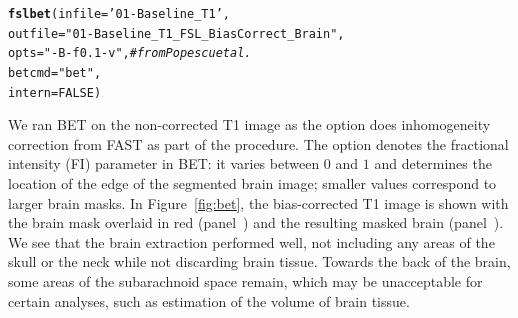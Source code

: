 \documentclass[a4paper]{report}\usepackage[]{graphicx}\usepackage[]{color}
\makeatletter
\newcommand{\hlnum}[1]{\textcolor[rgb]{0.686,0.059,0.569}{#1}}%
\newcommand{\hlstr}[1]{\textcolor[rgb]{0.192,0.494,0.8}{#1}}%
\newcommand{\hlcom}[1]{\textcolor[rgb]{0.678,0.584,0.686}{\textit{#1}}}%
\newcommand{\hlstd}[1]{\textcolor[rgb]{0.345,0.345,0.345}{#1}}%
\newcommand{\hlkwc}[1]{\textcolor[rgb]{0.333,0.667,0.333}{#1}}%
\newcommand{\hlkwd}[1]{\textcolor[rgb]{0.737,0.353,0.396}{\textbf{#1}}}%
\newenvironment{kframe}{%
 \def\at@end@of@kframe{}%
 \ifinner\ifhmode%
  \def\at@end@of@kframe{\end{minipage}}%
  \begin{minipage}{\columnwidth}%
 \fi\fi%
 \def\FrameCommand##1{\hskip\@totalleftmargin \hskip-\fboxsep
 \colorbox{shadecolor}{##1}\hskip-\fboxsep
     \hskip-\linewidth \hskip-\@totalleftmargin \hskip\columnwidth}%
 \MakeFramed {\advance\hsize-\width
   \@totalleftmargin\z@ \linewidth\hsize
   \@setminipage}}%
 {\par\unskip\endMakeFramed%
 \at@end@of@kframe}
\newenvironment{knitrout}{}{} %
\DeclareRobustCommand\code{\bgroup\@noligs\@codex}
\makeatother
\begin{document}
\begin{article}
\begin{knitrout}
\color{fgcolor}\begin{kframe}
\begin{alltt}
\hlkwd{fslbet}\hlstd{(}\hlkwc{infile} \hlstd{=}  \hlstr{'01-Baseline_T1'}\hlstd{,}
       \hlkwc{outfile} \hlstd{=} \hlstr{"01-Baseline_T1_FSL_BiasCorrect_Brain"}\hlstd{,}
       \hlkwc{opts} \hlstd{=} \hlstr{"-B -f 0.1 -v"}\hlstd{,}  \hlcom{# from Popescu et al.}
       \hlkwc{betcmd} \hlstd{=} \hlstr{"bet"}\hlstd{,}
       \hlkwc{intern}\hlstd{=}\hlnum{FALSE}\hlstd{)}
\end{alltt}
\end{kframe}
\end{knitrout}


We ran BET on the non-corrected T1 image as the \code{-B} option does inhomogeneity correction from FAST as part of the procedure.  The option \code{-f 0.1} denotes the fractional intensity (FI) parameter in BET: it varies between $0$ and $1$ and determines the location of the edge of the segmented brain image; smaller values correspond to larger brain masks. In Figure~\ref{fig:bet}, the bias-corrected T1 image is shown with the brain mask overlaid in red (panel~\protect{}) and the resulting masked brain (panel~\protect{}).  We see that the brain extraction performed well, not including any areas of the skull or the neck while not discarding brain tissue.  Towards the back of the brain, some areas of the subarachnoid space remain, which may be unacceptable for certain analyses, such as estimation of the volume of brain tissue.




\end{article}
\end{document}
